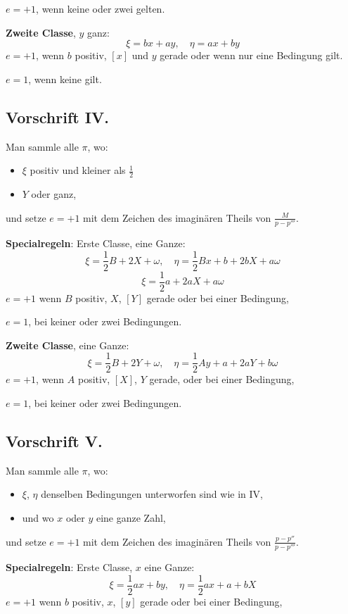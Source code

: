 \documentclass[12pt,a4paper]{article}
\begin{document}
$e = +1$, wenn keine oder zwei gelten.

\textbf{Zweite Classe}, $y$ ganz:
\[
\xi = bx + ay, \quad \eta = ax + by
\]
$e = +1$, wenn $b$ positiv, $[x]$ und $y$ gerade oder wenn nur eine Bedingung gilt.

$e = 1$, wenn keine gilt.

\subsection*{Vorschrift IV.}

Man sammle alle $\pi$, wo:
\begin{itemize}
\item $\xi$ positiv und kleiner als $\frac{1}{2}$
\item $Y$ oder ganz,
\end{itemize}
und setze $e = +1$ mit dem Zeichen des imaginären Theils von $\frac{M}{p-p'''}$.

\textbf{Specialregeln}: Erste Classe, eine Ganze:
\[
\xi = \frac{1}{2}B + 2X + \omega, \quad \eta = \frac{1}{2}Bx + b + 2bX + a\omega
\]
\[
\xi = \frac{1}{2}a + 2aX + a\omega
\]
$e = +1$ wenn $B$ positiv, $X$, $[Y]$ gerade oder bei einer Bedingung,

$e = 1$, bei keiner oder zwei Bedingungen.

\textbf{Zweite Classe}, eine Ganze:
\[
\xi = \frac{1}{2}B + 2Y + \omega, \quad \eta = \frac{1}{2}Ay + a + 2aY + b\omega
\]
$e = +1$, wenn $A$ positiv, $[X]$, $Y$ gerade, oder bei einer Bedingung,

$e = 1$, bei keiner oder zwei Bedingungen.

\subsection*{Vorschrift V.}

Man sammle alle $\pi$, wo:
\begin{itemize}
\item $\xi$, $\eta$ denselben Bedingungen unterworfen sind wie in IV,
\item und wo $x$ oder $y$ eine ganze Zahl,
\end{itemize}
und setze $e = +1$ mit dem Zeichen des imaginären Theils von $\frac{p-p''}{p-p'''}$.

\textbf{Specialregeln}: Erste Classe, $x$ eine Ganze:
\[
\xi = \frac{1}{2}ax + by, \quad \eta = \frac{1}{2}ax + a + bX
\]
$e = +1$ wenn $b$ positiv, $x$, $[y]$ gerade oder bei einer Bedingung,
\end{document}
